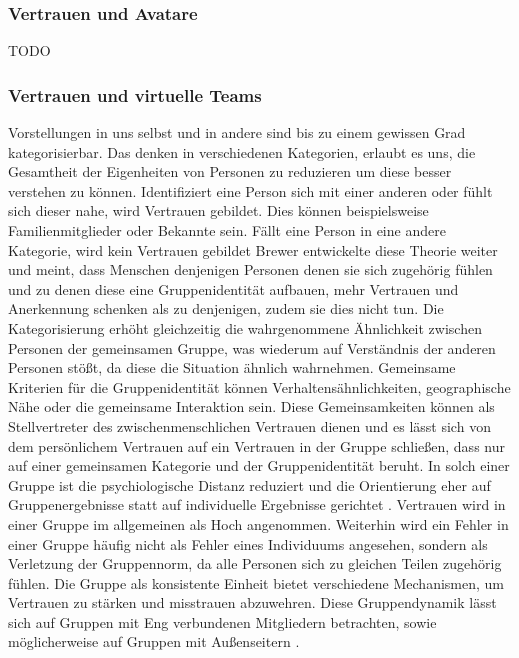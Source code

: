 \documentclass[a4paper,11pt]{article}%
\renewcommand{\\}{\vspace*{0.5\baselineskip} \newline}
\begin{document}
\subsubsection{Vertrauen und Avatare}
TODO
	\subsubsection{Vertrauen und virtuelle Teams}
	\label{Vertrauen und virtuelle Teams}
	
Vorstellungen in uns selbst und in andere sind bis zu einem gewissen Grad kategorisierbar. Das denken in verschiedenen Kategorien, erlaubt es uns, die Gesamtheit der Eigenheiten von Personen zu reduzieren um diese besser verstehen zu können. Identifiziert eine Person sich mit einer anderen oder fühlt sich dieser nahe, wird Vertrauen gebildet. Dies können beispielsweise Familienmitglieder oder Bekannte sein. Fällt eine Person in eine andere Kategorie, wird kein Vertrauen gebildet
\citep[397-403]{stolle2002trusting}
Brewer entwickelte diese Theorie weiter und meint, dass Menschen denjenigen Personen denen sie sich zugehörig fühlen und zu denen diese eine Gruppenidentität aufbauen, mehr Vertrauen und Anerkennung schenken als zu denjenigen, zudem sie dies nicht tun. Die Kategorisierung erhöht gleichzeitig die wahrgenommene Ähnlichkeit zwischen Personen der gemeinsamen Gruppe, was wiederum auf Verständnis der anderen Personen stößt, da diese die Situation ähnlich wahrnehmen.
Gemeinsame Kriterien für die Gruppenidentität können Verhaltensähnlichkeiten, geographische Nähe oder die gemeinsame Interaktion sein. Diese Gemeinsamkeiten können als Stellvertreter des zwischenmenschlichen Vertrauen dienen und es lässt sich von dem \dq{}persönlichem\dq{} Vertrauen auf ein \dq{} Vertrauen in der Gruppe \dq{} schließen, dass nur auf einer gemeinsamen Kategorie und der Gruppenidentität beruht.
In solch einer Gruppe ist die psychiologische Distanz reduziert und die Orientierung eher auf Gruppenergebnisse statt auf individuelle Ergebnisse gerichtet \citep[355-360]{brewer1981}.
Vertrauen wird in einer Gruppe im allgemeinen als Hoch angenommen. Weiterhin wird ein Fehler in einer Gruppe häufig nicht als Fehler eines Individuums angesehen, sondern als Verletzung der Gruppennorm, da alle Personen sich zu gleichen Teilen zugehörig fühlen. Die Gruppe als konsistente Einheit bietet verschiedene Mechanismen, um Vertrauen zu stärken und misstrauen abzuwehren. Diese Gruppendynamik lässt sich auf Gruppen mit Eng verbundenen Mitgliedern betrachten, sowie möglicherweise auf Gruppen mit Außenseitern \citep[397-403]{stolle2002trusting}.
\end{document}
